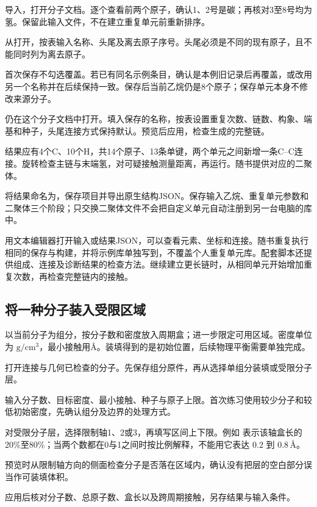 \begin{steps}
  \item 导入，打开分子文档。逐个查看前两个原子，确认1、2号是碳；再核对3至8号均为氢。保留此输入文件，不在建立重复单元前重新排序。
  \item 从打开，按表输入名称、头尾及离去原子序号。头尾必须是不同的现有原子，且不能同时列为离去原子。
  \item 首次保存不勾选覆盖。若已有同名示例条目，确认是本例旧记录后再覆盖，或改用另一个名称并在后续保持一致。保存后当前乙烷仍是8个原子；保存单元本身不修改来源分子。
  \item 仍在这个分子文档中打开。填入保存的名称，按表设置重复次数、链数、构象、端基和种子，头尾连接方式保持默认。预览后应用，检查生成的完整链。
  \item 结果应有4个C、10个H，共14个原子、13条单键，两个单元之间新增一条C--C连接。旋转检查主链与末端氢，对可疑接触测量距离，再运行。随书提供对应的二聚体。
  \item 将结果命名为，保存项目并导出原生结构JSON。保存输入乙烷、重复单元参数和二聚体三个阶段；只交换二聚体文件不会把自定义单元自动注册到另一台电脑的库中。
\end{steps}

用文本编辑器打开输入或结果JSON，可以查看元素、坐标和连接。随书重复执行相同的保存与构建，并将示例库单独写到，不覆盖个人重复单元库。配套脚本还提供组成、连接及诊断结果的检查方法。继续建立更长链时，从相同单元开始增加重复次数，再检查完整链内的接触。

\subsection{将一种分子装入受限区域}\label{sec:confined-packing-reference}

以当前分子为组分，按分子数和密度放入周期盒；进一步限定可用区域。密度单位为 $\mathrm{g/cm^3}$，最小接触用\AA。装填得到的是初始位置，后续物理平衡需要单独完成。

\begin{steps}
  \item 打开连接与几何已检查的分子。先保存组分原件，再从选择单组分装填或受限分子层。
  \item 输入分子数、目标密度、最小接触、种子与原子上限。首次练习使用较少分子和较低初始密度，先确认组分及边界的处理方式。
  \item 对受限分子层，选择限制轴1、2或3，再填写区间上下限。例如  表示该轴盒长的20\%至80\%；当两个数都在0与1之间时按比例解释，不能用它表达 $0.2$ 到 $0.8\,\text{\AA}$。
  \item 预览时从限制轴方向的侧面检查分子是否落在区域内，确认没有把层的空白部分误当作可装填体积。
  \item 应用后核对分子数、总原子数、盒长以及跨周期接触，另存结果与输入条件。
\end{steps}

